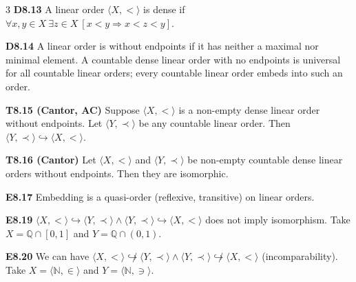 \documentclass[10pt, landscape]{article}
\begin{document}
\begin{multicols*}{3}
\textbf{D8.13} A linear order $\langle X, < \rangle$ is dense if $\forall x, y \in X \ \exists z \in X \ [x < y \Rightarrow x < z < y]$.

\textbf{D8.14} A linear order is without endpoints if it has neither a maximal nor minimal element. A countable dense linear order with no endpoints is universal for all countable linear orders; every countable linear order embeds into such an order.

\textbf{T8.15 (Cantor, AC)} Suppose $\langle X, < \rangle$ is a non-empty dense linear order without endpoints. Let $\langle Y, \prec \rangle$ be any countable linear order. Then $\langle Y, \prec \rangle \hookrightarrow \langle X, < \rangle$.

\textbf{T8.16 (Cantor)} Let $\langle X, < \rangle$ and $\langle Y, \prec \rangle$ be non-empty countable dense linear orders without endpoints. Then they are isomorphic.

\textbf{E8.17} Embedding is a quasi-order (reflexive, transitive) on linear orders.

\textbf{E8.19} $\langle X, < \rangle \hookrightarrow \langle Y, \prec \rangle \land \langle Y, \prec \rangle \hookrightarrow \langle X, < \rangle$ does not imply isomorphism. Take $X=\mathbb{Q} \cap [0, 1]$ and $Y=\mathbb{Q} \cap (0, 1)$.

\textbf{E8.20} We can have $\langle X, < \rangle \not \hookrightarrow \langle Y, \prec \rangle \land \langle Y, \prec \rangle \not \hookrightarrow \langle X, < \rangle$ (incomparability). Take $X=\langle \mathbb{N}, \in \rangle$ and $Y=\langle \mathbb{N}, \ni \rangle$.


\end{multicols*}
\end{document}
